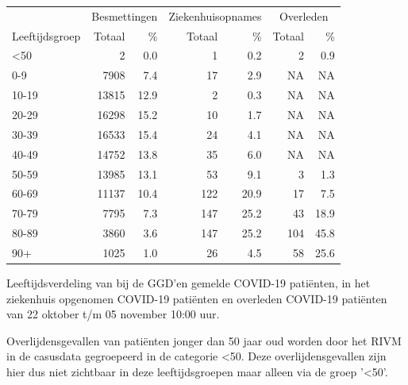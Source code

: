 \documentclass[
  english,
  man,floatsintext]{apa6}
\begin{document}
\begin{table}
\centering\begingroup\fontsize{11}{13}\selectfont

\begin{threeparttable}
\begin{tabular}{lrrrrrr}
\toprule
\multicolumn{1}{c}{ } & \multicolumn{2}{c}{Besmettingen} & \multicolumn{2}{c}{Ziekenhuisopnames} & \multicolumn{2}{c}{Overleden} \\
\cmidrule(l{3pt}r{3pt}){2-3} \cmidrule(l{3pt}r{3pt}){4-5} \cmidrule(l{3pt}r{3pt}){6-7}
Leeftijdsgroep & Totaal & \% & Totaal & \% & Totaal & \%\\
\midrule
<50 & 2 & 0.0 & 1 & 0.2 & 2 & 0.9\\
0-9 & 7908 & 7.4 & 17 & 2.9 & NA & NA\\
10-19 & 13815 & 12.9 & 2 & 0.3 & NA & NA\\
20-29 & 16298 & 15.2 & 10 & 1.7 & NA & NA\\
30-39 & 16533 & 15.4 & 24 & 4.1 & NA & NA\\
40-49 & 14752 & 13.8 & 35 & 6.0 & NA & NA\\
50-59 & 13985 & 13.1 & 53 & 9.1 & 3 & 1.3\\
60-69 & 11137 & 10.4 & 122 & 20.9 & 17 & 7.5\\
70-79 & 7795 & 7.3 & 147 & 25.2 & 43 & 18.9\\
80-89 & 3860 & 3.6 & 147 & 25.2 & 104 & 45.8\\
90+ & 1025 & 1.0 & 26 & 4.5 & 58 & 25.6\\
\bottomrule
\end{tabular}
\begin{tablenotes}
\item[1] Leeftijdsverdeling van bij de GGD’en gemelde COVID-19 patiënten, in het ziekenhuis opgenomen COVID-19 patiënten en overleden COVID-19 patiënten van 22 oktober t/m 05 november 10:00 uur.
\item[2] Overlijdensgevallen van patiënten jonger dan 50 jaar oud worden door het RIVM in de casusdata gegroepeerd in de categorie <50. Deze overlijdensgevallen zijn hier dus niet zichtbaar in deze leeftijdsgroepen maar alleen via de groep '<50'.
\end{tablenotes}
\end{threeparttable}
\endgroup{}
\end{table}

\newpage
\end{document}
